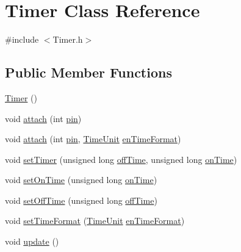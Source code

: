 \hypertarget{class_timer}{}\section{Timer Class Reference}
\label{class_timer}


{\ttfamily \#include $<$Timer.\+h$>$}

\subsection*{Public Member Functions}
\begin{DoxyCompactItemize}
\item 
\hyperlink{class_timer_a5f16e8da27d2a5a5242dead46de05d97}{Timer} ()
\item 
void \hyperlink{class_timer_a74db93921810ee98d337ed3cdc2bc513}{attach} (int \hyperlink{class_timer_a1452d92813046e6badb287f30789580e}{pin})
\item 
void \hyperlink{class_timer_ac780d2ae2072d2d2be6bdc8bcc0a3acc}{attach} (int \hyperlink{class_timer_a1452d92813046e6badb287f30789580e}{pin}, \hyperlink{_timer_8h_add9fe45e09605eee3e4a39c8a5c4476d}{Time\+Unit} \hyperlink{class_timer_a420f780693d99cab0cad9ae8202d834e}{en\+Time\+Format})
\item 
void \hyperlink{class_timer_a1a3d438cfafc29ab392e68eeea8c1952}{set\+Timer} (unsigned long \hyperlink{class_timer_a884fa0db2b95029da69e11fbb53612b2}{off\+Time}, unsigned long \hyperlink{class_timer_afa967387e3e6c7506334fcd886ea152a}{on\+Time})
\item 
void \hyperlink{class_timer_a3ec9029748dc5408795d59841497a254}{set\+On\+Time} (unsigned long \hyperlink{class_timer_afa967387e3e6c7506334fcd886ea152a}{on\+Time})
\item 
void \hyperlink{class_timer_a47474fcf4efcc8dfd7540b1a7b80b4ce}{set\+Off\+Time} (unsigned long \hyperlink{class_timer_a884fa0db2b95029da69e11fbb53612b2}{off\+Time})
\item 
void \hyperlink{class_timer_af8a1b1c47ee6812ddb29cd83deafaf36}{set\+Time\+Format} (\hyperlink{_timer_8h_add9fe45e09605eee3e4a39c8a5c4476d}{Time\+Unit} \hyperlink{class_timer_a420f780693d99cab0cad9ae8202d834e}{en\+Time\+Format})
\item 
void \hyperlink{class_timer_a745ad59b5a46744cd871a1129a25d74f}{update} ()
\end{DoxyCompactItemize}
